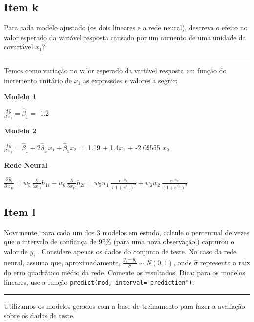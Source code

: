\documentclass[
  a4paperpaper,
]{article}
\begin{document}
\subsection{Item k}\label{item-k}

Para cada modelo ajustado (os dois lineares e a rede neural), descreva o
efeito no valor esperado da variável resposta causado por um aumento de
uma unidade da covariável \(x_1\)?

\begin{center}\rule{0.5\linewidth}{0.5pt}\end{center}

Temos como variação no valor esperado da variável resposta em função do
incremento unitário de \(x_1\) as expressões e valores a seguir:

\textbf{Modelo 1}

\(\frac{d \, \hat{y}}{d \, x_1} = \hat{\beta}_1 =\) 1.2 ~

\textbf{Modelo 2}

\(\frac{d \, \hat{y}}{d \, x_1} = \hat{\beta}_1 + 2\hat{\beta}_3 \, x_1 + \hat{\beta}_5 x_2 =\)
1.19 + 1.4\(x_1\) + -2.09555 \(x_2\) ~

\textbf{Rede Neural}

\(\frac{\partial \, \hat{y}_i}{\partial \, x_{1i}} = w_5 \, \frac{\partial}{\partial x_{1i}} h_{1i} + w_6\, \frac{\partial}{\partial x_{1i}} h_{2i} = w_5w_1 \, \frac{e^{-a_{1i}}}{(1+e^{a_{1i}})^2} + w_6w_2 \, \frac{e^{-a_{2i}}}{(1+e^{a_{2i}})^2}\)

\subsection{Item l}\label{item-l}

Novamente, para cada um dos 3 modelos em estudo, calcule o percentual de
vezes que o intervalo de confiança de 95\% (para uma nova observação!)
capturou o valor de \(y_i\) . Considere apenas os dados do conjunto de
teste. No caso da rede neural, assuma que, aproximadamente,
\(\frac{y_i - \hat{y}_i}{\hat{\sigma}} \sim N (0, 1)\), onde
\(\hat{\sigma}\) representa a raiz do erro quadrático médio da rede.
Comente os resultados. Dica: para os modelos lineares, use a função
\texttt{predict(mod,\ interval="prediction")}.

\begin{center}\rule{0.5\linewidth}{0.5pt}\end{center}

Utilizamos os modelos gerados com a base de treinamento para fazer a
avaliação sobre os dados de teste.
\end{document}
